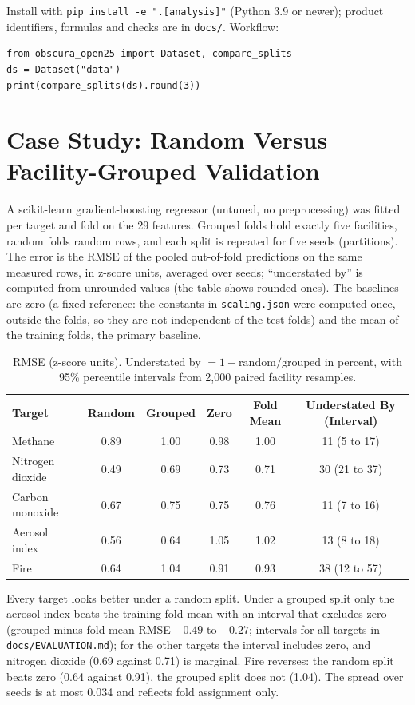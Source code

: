 \documentclass[notspecified,datadescriptor,submit,oneauthor]{Definitions/mdpi}
\begin{document}
Install with \texttt{pip install -e ".[analysis]"} (Python 3.9 or newer); product identifiers, formulas and checks are in \texttt{docs/}. Workflow:
{\footnotesize
\begin{verbatim}
from obscura_open25 import Dataset, compare_splits
ds = Dataset("data")
print(compare_splits(ds).round(3))
\end{verbatim}}

\section{Case Study: Random Versus Facility-Grouped Validation}

A scikit-learn gradient-boosting regressor (untuned, no preprocessing) was fitted per target and fold on the 29 features. Grouped folds hold exactly five facilities, random folds random rows, and each split is repeated for five seeds (partitions). The error is the RMSE of the pooled out-of-fold predictions on the same measured rows, in z-score units, averaged over seeds; ``understated by'' is computed from unrounded values (the table shows rounded ones). The baselines are zero (a fixed reference: the constants in \texttt{scaling.json} were computed once, outside the folds, so they are not independent of the test folds) and the mean of the training folds, the primary baseline.

\begin{table}[H]\centering
\caption{RMSE (z-score units). Understated by $=1-\mathrm{random}/\mathrm{grouped}$ in percent, with 95\% percentile intervals from 2,000 paired facility resamples.\label{tab1}}
\begin{tabular}{lccccc}
\toprule
\textbf{Target} & \textbf{Random} & \textbf{Grouped} & \textbf{Zero} & \textbf{Fold Mean} & \textbf{Understated By (Interval)}\\
\midrule
Methane & 0.89 & 1.00 & 0.98 & 1.00 & 11 (5 to 17)\\
Nitrogen dioxide & 0.49 & 0.69 & 0.73 & 0.71 & 30 (21 to 37)\\
Carbon monoxide & 0.67 & 0.75 & 0.75 & 0.76 & 11 (7 to 16)\\
Aerosol index & 0.56 & 0.64 & 1.05 & 1.02 & 13 (8 to 18)\\
Fire & 0.64 & 1.04 & 0.91 & 0.93 & 38 (12 to 57)\\
\bottomrule
\end{tabular}
\end{table}

Every target looks better under a random split. Under a grouped split only the aerosol index beats the training-fold mean with an interval that excludes zero (grouped minus fold-mean RMSE $-0.49$ to $-0.27$; intervals for all targets in \texttt{docs/EVALUATION.md}); for the other targets the interval includes zero, and nitrogen dioxide (0.69 against 0.71) is marginal. Fire reverses: the random split beats zero (0.64 against 0.91), the grouped split does not (1.04). The spread over seeds is at most 0.034 and reflects fold assignment only.
\end{document}
